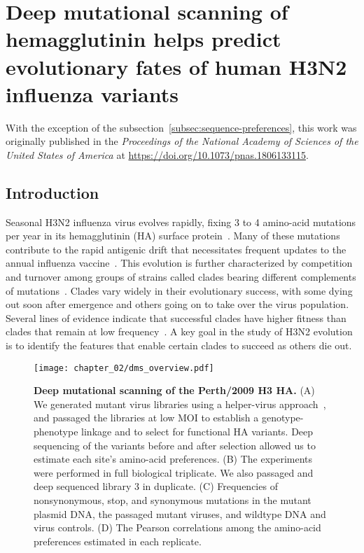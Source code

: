 \chapter{Deep mutational scanning of hemagglutinin helps predict evolutionary fates of human H3N2 influenza variants}

With the exception of the subsection~\ref{subsec:sequence-preferences}, this work was originally published in the \emph{Proceedings of the National Academy of Sciences of the United States of America} at \url{https://doi.org/10.1073/pnas.1806133115}.

\section{Introduction}

Seasonal H3N2 influenza virus evolves rapidly, fixing 3 to 4 amino-acid mutations per year in its hemagglutinin (HA) surface protein~\citep{fitch1997long, bhatt2011genomic}.
Many of these mutations contribute to the rapid antigenic drift that necessitates frequent updates to the annual influenza vaccine~\citep{Smith:2004jc}.
This evolution is further characterized by competition and turnover among groups of strains called clades bearing different complements of mutations~\citep{bedford2011,strelkowa2012clonal,Neher:2014eu,Koelle:2015dh,Bedford:2015fj}.
Clades vary widely in their evolutionary success, with some dying out soon after emergence and others going on to take over the virus population.
Several lines of evidence indicate that successful clades have higher fitness than clades that remain at low frequency~\citep{bedford2011,strelkowa2012clonal,Neher:2014eu,Luksza:2014hj}.
A key goal in the study of H3N2 evolution is to identify the features that enable certain clades to succeed as others die out.

\begin{figure}
  \centering
  \texttt{[image: chapter\_02/dms\_overview.pdf]}
  \caption{\label{fig:dms_overview}
    {\bf Deep mutational scanning of the Perth/2009 H3 HA.}
    (A) We generated mutant virus libraries using a helper-virus approach~\citep{Doud:2016gm}, and passaged the libraries at low MOI to establish a genotype-phenotype      linkage and to select for functional HA variants.
    Deep sequencing of the variants before and after selection allowed us to estimate each site's amino-acid preferences.
    (B) The experiments were performed in full biological triplicate.
    We also passaged and deep sequenced library 3 in duplicate.
    (C) Frequencies of nonsynonymous, stop, and synonymous mutations in the mutant plasmid DNA, the passaged mutant viruses, and wildtype DNA and virus controls.
    (D) The Pearson correlations among the amino-acid preferences estimated in each replicate.
  }
\end{figure}

